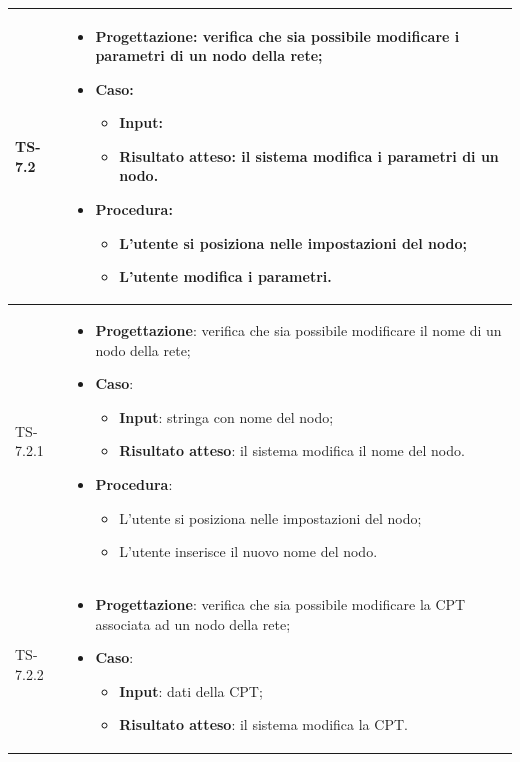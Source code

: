 \begin{longtable}{|C{2.5cm}|C{13cm}|}
	  \\
	\hline
	{TS-7.2} &
\begin{itemize}
	\item \textbf{Progettazione}: verifica che sia possibile modificare i
	parametri di un nodo della rete;
	\item \textbf{Caso}: 
	\begin{itemize}
		\item \textbf{Input}: 
		\item \textbf{Risultato atteso}: il sistema modifica i parametri di un nodo.
	\end{itemize}
	\item \textbf{Procedura}:
	\begin{itemize}
		\item L'utente si posiziona nelle impostazioni del nodo;
		\item L'utente modifica i parametri.
	\end{itemize} 
\end{itemize}
	 \\
	\hline
	{TS-7.2.1} & 
\begin{itemize}
	\item \textbf{Progettazione}: verifica che sia  possibile modificare il
	nome di un nodo della rete;
	\item \textbf{Caso}: 
	\begin{itemize}
		\item \textbf{Input}: stringa con nome del nodo;
		\item \textbf{Risultato atteso}: il sistema modifica il nome del nodo.
	\end{itemize}
	\item \textbf{Procedura}:
	\begin{itemize}
		\item L'utente si posiziona nelle impostazioni del nodo;
		\item L'utente inserisce il nuovo nome del nodo.
	\end{itemize} 
\end{itemize}
	 \\
	\hline
	{TS-7.2.2} & 
\begin{itemize}
	\item \textbf{Progettazione}: verifica che sia possibile modificare la
	CPT associata ad un nodo della rete;
	\item \textbf{Caso}: 
	\begin{itemize}
		\item \textbf{Input}: dati della CPT;
		\item \textbf{Risultato atteso}: il sistema modifica la CPT.

\end{itemize}
\end{itemize}
\end{longtable}
